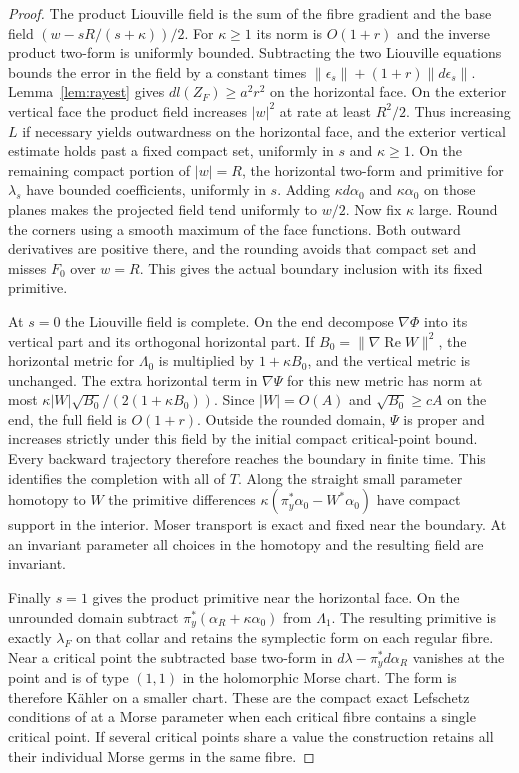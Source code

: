 \begin{proof}
The product Liouville field is the sum of the fibre gradient and the base field $(w-sR/(s+\kappa))/2$. For $\kappa\ge1$ its norm is $O(1+r)$ and the inverse product two-form is uniformly bounded. Subtracting the two Liouville equations bounds the error in the field by a constant times $\|\epsilon_s\|+(1+r)\|d\epsilon_s\|$. Lemma~\ref{lem:rayest} gives $dl(Z_F)\ge a^2r^2$ on the horizontal face. On the exterior vertical face the product field increases $|w|^2$ at rate at least $R^2/2$. Thus increasing $L$ if necessary yields outwardness on the horizontal face, and the exterior vertical estimate holds past a fixed compact set, uniformly in $s$ and $\kappa\ge1$. On the remaining compact portion of $|w|=R$, the horizontal two-form and primitive for $\lambda_s$ have bounded coefficients, uniformly in $s$. Adding $\kappa d\alpha_0$ and $\kappa\alpha_0$ on those planes makes the projected field tend uniformly to $w/2$. Now fix $\kappa$ large. Round the corners using a smooth maximum of the face functions. Both outward derivatives are positive there, and the rounding avoids that compact set and misses $F_0$ over $w=R$. This gives the actual boundary inclusion with its fixed primitive.

At $s=0$ the Liouville field is complete. On the end decompose $\nabla\Phi$ into its vertical part and its orthogonal horizontal part. If $B_0=\|\nabla\operatorname{Re}W\|^2$, the horizontal metric for $\Lambda_0$ is multiplied by $1+\kappa B_0$, and the vertical metric is unchanged. The extra horizontal term in $\nabla\Psi$ for this new metric has norm at most $\kappa|W|\sqrt{B_0}/(2(1+\kappa B_0))$. Since $|W|=O(A)$ and $\sqrt{B_0}\ge c A$ on the end, the full field is $O(1+r)$. Outside the rounded domain, $\Psi$ is proper and increases strictly under this field by the initial compact critical-point bound. Every backward trajectory therefore reaches the boundary in finite time. This identifies the completion with all of $T$. Along the straight small parameter homotopy to $W$ the primitive differences $\kappa(\pi_y^*\alpha_0-W^*\alpha_0)$ have compact support in the interior. Moser transport is exact and fixed near the boundary. At an invariant parameter all choices in the homotopy and the resulting field are invariant.

Finally $s=1$ gives the product primitive near the horizontal face. On the unrounded domain subtract $\pi_y^*(\alpha_R+\kappa\alpha_0)$ from $\Lambda_1$. The resulting primitive is exactly $\lambda_F$ on that collar and retains the symplectic form on each regular fibre. Near a critical point the subtracted base two-form in $d\lambda-\pi_y^*d\alpha_R$ vanishes at the point and is of type $(1,1)$ in the holomorphic Morse chart. The form is therefore Kähler on a smaller chart. These are the compact exact Lefschetz conditions of \cite[Definitions~2.12--2.17]{McL} at a Morse parameter when each critical fibre contains a single critical point. If several critical points share a value the construction retains all their individual Morse germs in the same fibre.
\end{proof}
